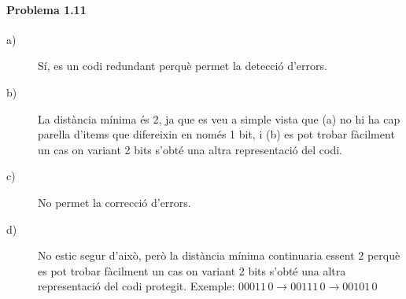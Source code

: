 \documentclass[catalan,border=15pt,class=scrartcl,multi=minipage]{standalone}
\begin{document}
\begin{minipage}{30em}

\paragraph{Problema 1.11}

\begin{description}
\item[{a)}] Sí, es un codi redundant perquè permet la detecció d'errors.

\item[{b)}] La distància mínima és $2$, ja que es veu a simple vista que (a) no hi
ha cap parella d'items que difereixin en només 1 bit, i (b) es pot trobar fàcilment
un cas on variant 2 bits s'obté una altra representació del codi.

\item[{c)}] No permet la correcció d'errors.

\item[{d)}] No estic segur d'això, però la distància mínima continuaria essent $2$
perquè es pot trobar fàcilment un cas on variant 2 bits s'obté una altra representació
del codi protegit. Exemple: $00011\,0 \rightarrow 00111\,0 \rightarrow 00101\,0$
\end{description}

\end{minipage}
\end{document}
